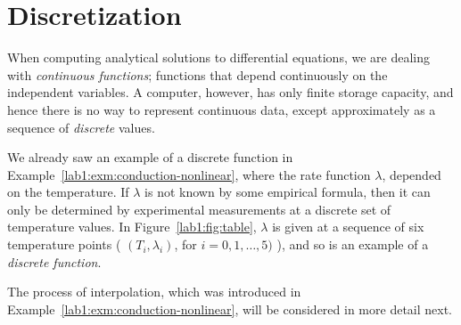 % 
%
%
%
%
%
%
%
%
%
%
%
%

\section{Discretization}

When computing analytical solutions to differential equations, we are
dealing with \emph{continuous functions}; \ie functions that depend
continuously on the independent variables.  A computer, however, has
only finite storage capacity, and hence there is no way to represent
continuous data, except approximately as a sequence of \emph{discrete}
values.

\begin{example}
  We already saw an example of a discrete function in
  Example~\ref{lab1:exm:conduction-nonlinear}, where the rate function
  $\lambda$, depended on the temperature.
  If $\lambda$ is not known by
  some empirical formula, then it can only be determined by
  experimental  
  measurements at a discrete set of temperature values. 
  In Figure~\ref{lab1:fig:table}, $\lambda$ is given at a sequence of six
  temperature 
  points ( $(T_i, \lambda_i)$, for $i = 0, 1, \dots, 5)$ ), and so is
  an example of a \emph{discrete function}.

  The process of interpolation, which was introduced in
  Example~\ref{lab1:exm:conduction-nonlinear}, will be considered in more
  detail next.
\end{example}

